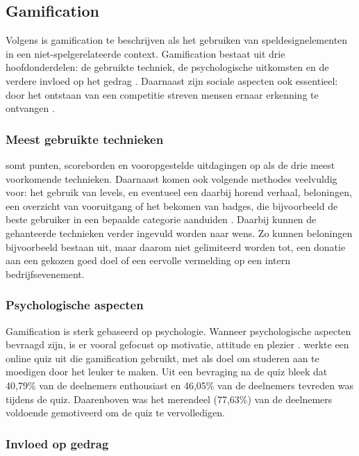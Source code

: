 \subsection{Gamification}

Volgens \textcite{Deterding2011} is gamification te beschrijven als het gebruiken van speldesignelementen in een niet-spelgerelateerde context. Gamification bestaat uit drie hoofdonderdelen: de gebruikte techniek, de psychologische uitkomsten en de verdere invloed op het gedrag \autocite{Hamari2014}. Daarnaast zijn sociale aspecten ook essentieel: door het ontstaan van een competitie streven mensen ernaar erkenning te ontvangen \autocite{Hamari2013}.

\subsubsection{Meest gebruikte technieken}

\textcite{Hamari2014} somt punten, scoreborden en vooropgestelde uitdagingen op als de drie meest voorkomende technieken. Daarnaast komen ook volgende methodes veelvuldig voor: het gebruik van levels, en eventueel een daarbij horend verhaal, beloningen, een overzicht van vooruitgang of het bekomen van badges, die bijvoorbeeld de beste gebruiker in een bepaalde categorie aanduiden \autocite{Dong2012,Flatla2011,Li2012}.
Daarbij kunnen de gehanteerde technieken verder ingevuld worden naar wens. Zo kunnen beloningen bijvoorbeeld bestaan uit, maar daarom niet gelimiteerd worden tot, een donatie aan een gekozen goed doel of een eervolle vermelding op een intern bedrijfsevenement.


\subsubsection{Psychologische aspecten}

Gamification is sterk gebaseerd op psychologie. Wanneer psychologische aspecten bevraagd zijn, is er vooral gefocust op motivatie, attitude en plezier \autocite{Hamari2014}. \textcite{Cheong2013} werkte een online quiz uit die gamification gebruikt, met als doel om studeren aan te moedigen door het leuker te maken. Uit een bevraging  na de quiz bleek dat 40,79\% van de deelnemers enthousiast en 46,05\% van de deelnemers tevreden was tijdens de quiz. Daarenboven was het merendeel (77,63\%) van de deelnemers voldoende gemotiveerd om de quiz te vervolledigen.

\subsubsection{Invloed op gedrag}

